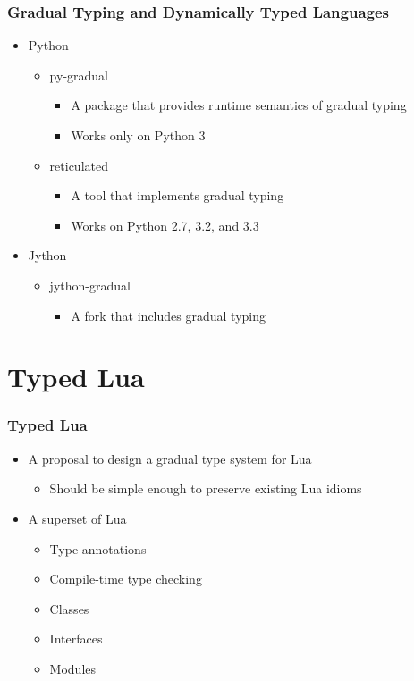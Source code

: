\documentclass{beamer}
\begin{document}
\begin{frame}
\frametitle{Gradual Typing and Dynamically Typed Languages}
\begin{itemize}
\item Python
\begin{itemize}
\item py-gradual
\begin{itemize}
\item A package that provides runtime semantics of gradual typing
\item Works only on Python 3
\end{itemize}
\item reticulated
\begin{itemize}
\item A tool that implements gradual typing
\item Works on Python 2.7, 3.2, and 3.3
\end{itemize}
\end{itemize}
\item Jython
\begin{itemize}
\item jython-gradual
\begin{itemize}
\item A fork that includes gradual typing
\end{itemize}
\end{itemize}
\end{itemize}
\end{frame}

\section{Typed Lua}
\begin{frame}
\frametitle{Typed Lua}
\begin{itemize}
\item A proposal to design a gradual type system for Lua
\begin{itemize}
\item Should be simple enough to preserve existing Lua idioms
\end{itemize}
\item A superset of Lua
\begin{itemize}
\item Type annotations
\item Compile-time type checking
\item Classes
\item Interfaces
\item Modules
\end{itemize}
\end{itemize}
\end{frame}
\end{document}
